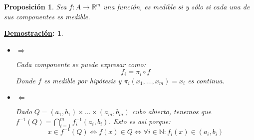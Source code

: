 \documentclass[10pt,a4paper,openright]{book}
\theoremstyle{break}
\newtheorem*{prop}{Proposición}
\newtheorem*{demo}{\underline{Demostración}:}
\begin{document}
\begin{prop}
Sea $f: A \rightarrow \mathbb{R}^m$ una función, es medible si y sólo si cada una de sus componentes es medible.
\end{prop}
\begin{demo}
\begin{itemize}
\item $\Rightarrow$

Cada componente se puede expresar como:
$$f_i = \pi_i \circ f$$
Donde $f$ es medible por hipótesis y $\pi_i\left( x_1, \ldots, x_m \right) = x_i$ es continua.

\item $\Leftarrow$

Dado $Q = \left( a_1, b_1 \right) \times \ldots \times \left( a_m, b_m \right)$ cubo abierto, tenemos que $f^{-1}\left( Q \right) = \bigcap_{i = 1}^{m} f_i^{-1}\left( a_i, b_i \right)$. Esto es así porque:
$$x \in f^{-1}\left( Q \right) \Leftrightarrow f\left( x \right) \in Q \Leftrightarrow \forall i \in \mathbb{N} : f_i\left( x \right) \in \left( a_i, b_i \right)$$
\end{itemize}
\end{demo}
\end{document}
